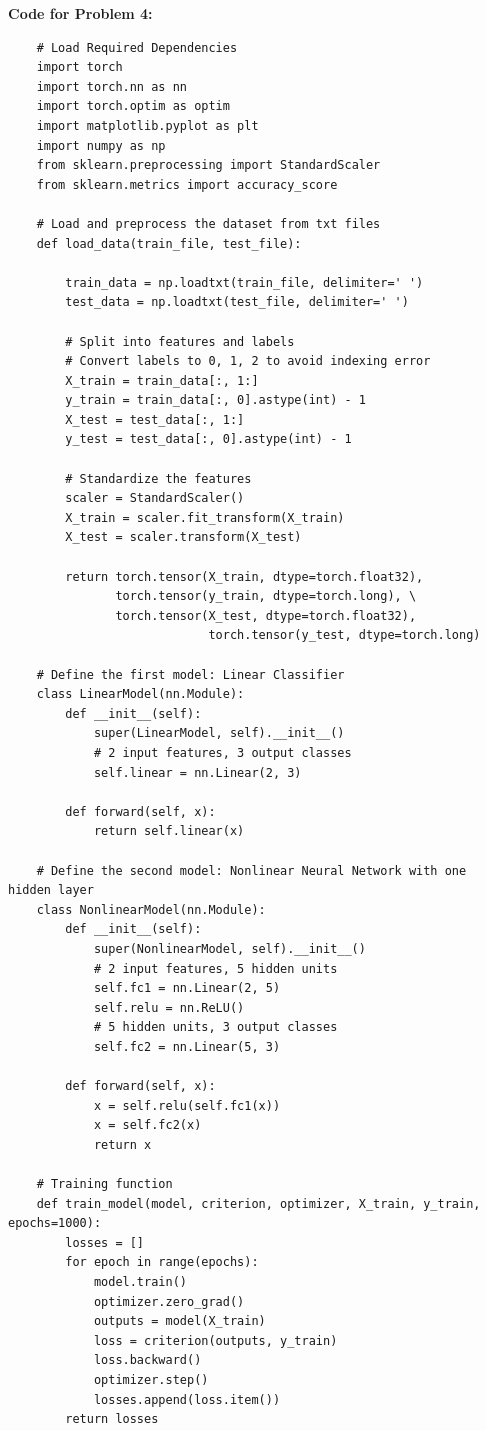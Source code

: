 \documentclass[11pt, oneside]{article}   	%
\begin{document}
\textbf{Code for Problem 4:} \\
\begin{verbatim}
    # Load Required Dependencies
    import torch
    import torch.nn as nn
    import torch.optim as optim
    import matplotlib.pyplot as plt
    import numpy as np
    from sklearn.preprocessing import StandardScaler
    from sklearn.metrics import accuracy_score
    
    # Load and preprocess the dataset from txt files
    def load_data(train_file, test_file):
        
        train_data = np.loadtxt(train_file, delimiter=' ')
        test_data = np.loadtxt(test_file, delimiter=' ')
        
        # Split into features and labels
        # Convert labels to 0, 1, 2 to avoid indexing error
        X_train = train_data[:, 1:]  
        y_train = train_data[:, 0].astype(int) - 1 
        X_test = test_data[:, 1:]
        y_test = test_data[:, 0].astype(int) - 1 
        
        # Standardize the features
        scaler = StandardScaler()
        X_train = scaler.fit_transform(X_train)
        X_test = scaler.transform(X_test)
        
        return torch.tensor(X_train, dtype=torch.float32), 
               torch.tensor(y_train, dtype=torch.long), \
               torch.tensor(X_test, dtype=torch.float32), 
                            torch.tensor(y_test, dtype=torch.long)
    
    # Define the first model: Linear Classifier
    class LinearModel(nn.Module):
        def __init__(self):
            super(LinearModel, self).__init__()
            # 2 input features, 3 output classes
            self.linear = nn.Linear(2, 3)
        
        def forward(self, x):
            return self.linear(x)
    
    # Define the second model: Nonlinear Neural Network with one hidden layer
    class NonlinearModel(nn.Module):
        def __init__(self):
            super(NonlinearModel, self).__init__()
            # 2 input features, 5 hidden units
            self.fc1 = nn.Linear(2, 5)  
            self.relu = nn.ReLU()
            # 5 hidden units, 3 output classes
            self.fc2 = nn.Linear(5, 3)  
        
        def forward(self, x):
            x = self.relu(self.fc1(x))
            x = self.fc2(x)
            return x
    
    # Training function
    def train_model(model, criterion, optimizer, X_train, y_train, epochs=1000):
        losses = []
        for epoch in range(epochs):
            model.train()
            optimizer.zero_grad()
            outputs = model(X_train)
            loss = criterion(outputs, y_train)
            loss.backward()
            optimizer.step()
            losses.append(loss.item())
        return losses
    

\end{verbatim}
\end{document}
